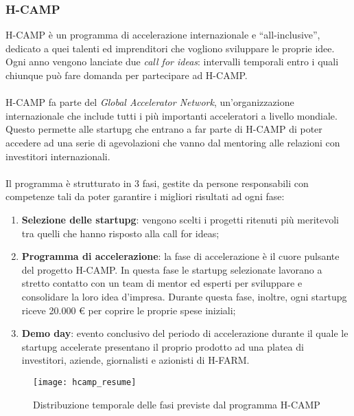 \subsubsection{H-CAMP}
H-CAMP è un programma di accelerazione internazionale e “all-inclusive”, dedicato a quei talenti ed imprenditori che vogliono sviluppare le proprie idee.
Ogni anno vengono lanciate due \textit{call for ideas}: intervalli temporali entro i quali chiunque può fare domanda per partecipare ad H-CAMP.
\\ \\
H-CAMP fa parte del \textit{Global Accelerator Network}, un'organizzazione internazionale che include tutti i più importanti acceleratori a livello mondiale. Questo permette alle \gls{startupg}\glsfirstoccur{} che entrano a far parte di H-CAMP di poter accedere ad una serie di agevolazioni che vanno dal \gls{mentoring}\glsfirstoccur{} alle relazioni con investitori internazionali.
\\ \\
Il programma è strutturato in 3 fasi, gestite da persone responsabili con competenze tali da poter garantire i migliori risultati ad ogni fase:
\begin{enumerate}
\item \textbf{Selezione delle \gls{startupg}\glsfirstoccur}: vengono scelti i progetti ritenuti più meritevoli tra quelli che hanno risposto alla call for ideas;
\item \textbf{Programma di accelerazione}: la fase di accelerazione è il cuore pulsante del progetto H-CAMP. In questa fase le \gls{startupg}\glsfirstoccur{} selezionate lavorano a stretto contatto con un team di \gls{mentor}\glsfirstoccur{}  ed esperti per sviluppare e consolidare la loro idea d'impresa. Durante questa fase, inoltre, ogni \gls{startupg}\glsfirstoccur{} riceve 20.000 \euro{} per coprire le proprie spese iniziali;
\item \textbf{Demo day}: evento conclusivo del periodo di accelerazione durante il quale le \gls{startupg}\glsfirstoccur{} accelerate presentano il proprio prodotto ad una platea di investitori, aziende, giornalisti e azionisti di H-FARM.
\end{enumerate}

\begin{figure}[htbp]
\begin{center}
\texttt{[image: hcamp\_resume]}
\caption{Distribuzione temporale delle fasi previste dal programma H-CAMP}
\end{center}
\end{figure}

